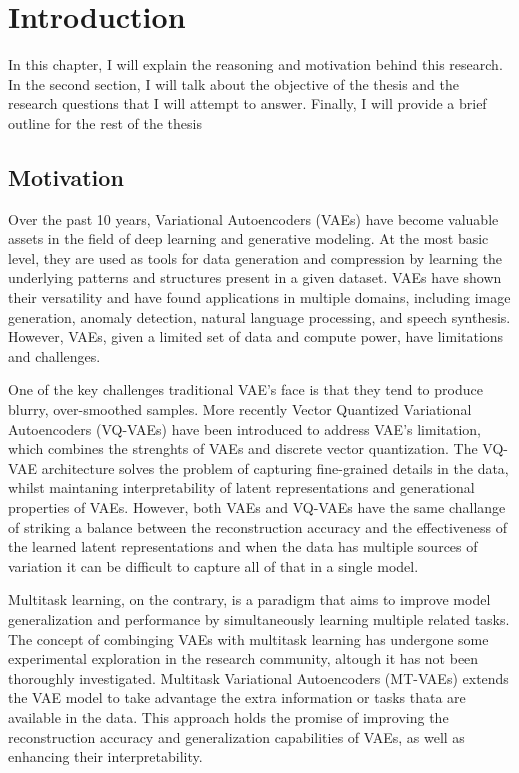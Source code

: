 \chapter{Introduction}

In this chapter, I will explain the reasoning and motivation behind this research. In the second section, I will talk about the objective of the thesis and the research questions that I will attempt to answer. Finally, I will provide a brief outline for the rest of the thesis

\section{Motivation}

Over the past 10 years, Variational Autoencoders (VAEs) have become valuable assets in the field of deep learning and generative modeling. At the most basic level, they are used as tools for data generation and compression by learning the underlying patterns and structures present in a given dataset. VAEs have shown their versatility and have found applications in multiple domains, including image generation, anomaly detection, natural language processing, and speech synthesis. However, VAEs, given a limited set of data and compute power, have limitations and challenges\cite{kingma2013autoencoding,Kingma_2019, vqvae, dalle}.

One of the key challenges traditional VAE's face is that they tend to produce blurry, over-smoothed samples. More recently Vector Quantized Variational Autoencoders (VQ-VAEs) have been introduced to address VAE's limitation, which combines the strenghts of VAEs and discrete vector quantization\cite{dalle}. The VQ-VAE architecture solves the problem of capturing fine-grained details in the data, whilst maintaning interpretability of latent representations and generational properties of VAEs. However, both VAEs and VQ-VAEs have the same challange of striking a balance between the reconstruction accuracy and the effectiveness of the learned latent representations and when the data has multiple sources of variation it can be difficult to capture all of that in a single model\cite{Kingma_2019,betavae, vqvae}.

Multitask learning, on the contrary, is a paradigm that aims to improve model generalization and performance by simultaneously learning multiple related tasks. The concept of combinging VAEs with multitask learning has undergone some experimental exploration in the research community, altough it has not been thoroughly investigated\cite{multitaskvib}. Multitask Variational Autoencoders (MT-VAEs) extends the VAE model to take advantage the extra information or tasks thata are available in the data. This approach holds the promise of improving the reconstruction accuracy and generalization capabilities of VAEs, as well as enhancing their interpretability\cite{multitasklearning}.

